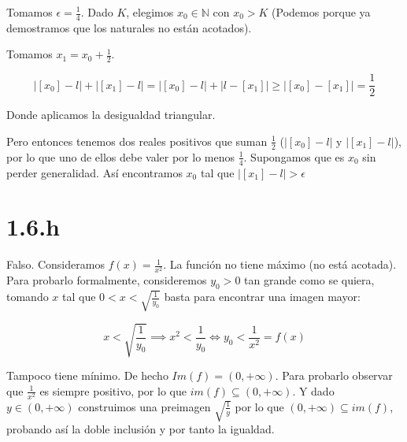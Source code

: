 \documentclass[10pt,a4paper]{article}
\begin{document}
\noindent
Tomamos $\epsilon=\frac{1}{4}$. Dado $K$, elegimos $x_0\in\mathbb{N}$ con
$x_0>K$ (Podemos porque ya demostramos que los naturales no est\'an acotados).

\noindent
Tomamos $x_1 = x_0 + \frac{1}{2}$.

$$
  |[x_0] - l| + |[x_1] - l|
= |[x_0] - l| + |l - [x_1]| \geq |[x_0] - [x_1]| = \frac{1}{2}
$$

Donde aplicamos la desigualdad triangular.

\noindent
Pero entonces tenemos dos reales positivos que suman $\frac{1}{2}$
($|[x_0] - l|$ y $|[x_1] - l|$),
por lo que
uno de ellos debe valer por lo menos $\frac{1}{4}$. Supongamos que es
$x_0$ sin perder generalidad. As\'i encontramos $x_0$ tal que
$|[x_1] - l| > \epsilon$ 


\section*{1.6.h}\emph{}

Falso. Consideramos $\displaystyle{f(x) = \frac{1}{x^2}}$.
La funci\'on no tiene m\'aximo (no est\'a acotada).
Para probarlo formalmente, consideremos $y_0 > 0$
tan grande como se quiera, tomando $x$ tal que
$\displaystyle{ 0 < x < \sqrt{\frac{1}{y_0}}}$
basta para encontrar una imagen mayor:

$$
x < \sqrt{\frac{1}{y_0}} \implies x^2
< \frac{1}{y_0} \iff y_0 < \frac{1}{x^2} = f(x)
$$


Tampoco tiene m\'inimo. De hecho $Im(f) = \left( 0, + \infty\right)$.
Para probarlo observar que $\displaystyle{\frac{1}{x^2}}$
es siempre positivo,
por lo que $im(f)\subseteq \left( 0, + \infty\right)$. Y dado
$y\in \left( 0, + \infty\right)$ construimos una preimagen
$\sqrt{\frac{1}{y}}$ por lo que $\left( 0, + \infty\right)
\subseteq im(f)$, probando as\'i la doble inclusi\'on
y por tanto la igualdad.
\end{document}
